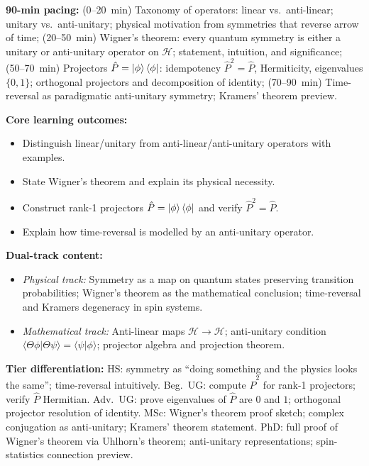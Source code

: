 \documentclass[11pt,a4paper]{article}
\begin{document}
\begin{tcolorbox}[modulebox, title={Module~I.1 --- Lecture L05: Types of Symmetry Operators and Wigner's Theorem}]
\textbf{90-min pacing:} (0--20~min) Taxonomy of operators: linear vs.\ anti-linear;
unitary vs.\ anti-unitary; physical motivation from symmetries that reverse arrow of time;
(20--50~min) Wigner's theorem: every quantum symmetry is either a unitary or anti-unitary operator
on $\mathcal{H}$; statement, intuition, and significance;
(50--70~min) Projectors $\hat{P} = \ket{\phi}\bra{\phi}$: idempotency $\hat{P}^2=\hat{P}$,
Hermiticity, eigenvalues $\{0,1\}$; orthogonal projectors and decomposition of identity;
(70--90~min) Time-reversal as paradigmatic anti-unitary symmetry; Kramers' theorem preview.

\medskip\textbf{Core learning outcomes:}
\begin{itemize}[leftmargin=1.4em,topsep=2pt,itemsep=1pt]
  \item Distinguish linear/unitary from anti-linear/anti-unitary operators with examples.
  \item State Wigner's theorem and explain its physical necessity.
  \item Construct rank-1 projectors $\hat{P}=\ket{\phi}\bra{\phi}$ and verify $\hat{P}^2=\hat{P}$.
  \item Explain how time-reversal is modelled by an anti-unitary operator.
\end{itemize}

\medskip\textbf{Dual-track content:}
\begin{itemize}[leftmargin=1.4em,topsep=2pt,itemsep=1pt]
  \item \textit{Physical track:} Symmetry as a map on quantum states preserving transition probabilities;
    Wigner's theorem as the mathematical conclusion; time-reversal and Kramers degeneracy in spin systems.
  \item \textit{Mathematical track:} Anti-linear maps $\mathcal{H}\to\mathcal{H}$;
    anti-unitary condition $\langle\Theta\phi|\Theta\psi\rangle = \langle\psi|\phi\rangle$;
    projector algebra and projection theorem.
\end{itemize}

\medskip\textbf{Tier differentiation:}
HS: symmetry as ``doing something and the physics looks the same''; time-reversal intuitively.
Beg.\ UG: compute $\hat{P}^2$ for rank-1 projectors; verify $\hat{P}$ Hermitian.
Adv.\ UG: prove eigenvalues of $\hat{P}$ are $0$ and $1$; orthogonal projector resolution of identity.
MSc: Wigner's theorem proof sketch; complex conjugation as anti-unitary; Kramers' theorem statement.
PhD: full proof of Wigner's theorem via Uhlhorn's theorem; anti-unitary representations; spin-statistics connection preview.


\end{tcolorbox}
\end{document}
